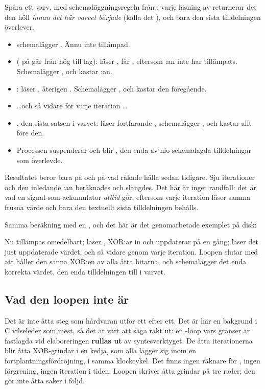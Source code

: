 Spåra ett varv, med schemaläggningsregeln från : varje läsning av
 returnerar det den höll \emph{innan det här varvet började} (kalla det
), och bara den sista tilldelningen överlever.
\begin{itemize}
  \item {} schemalägger . Ännu inte tillämpad.
  \item {} ( på  går från hög till låg): läser
    , får , eftersom :an inte har tillämpats.
    Schemalägger , och kastar :an.
  \item {}: läser , återigen . Schemalägger
    , och kastar den föregående.
  \item \dots och så vidare för varje iteration \dots
  \item {}, den sista satsen i varvet: läser fortfarande , schemalägger
    , och kastar allt före den.
  \item Processen suspenderar och  blir , den enda av
    nio schemalagda tilldelningar som överlevde.
\end{itemize}

Resultatet beror bara på  och på vad  råkade hålla sedan tidigare. Sju
iterationer och den inledande :an beräknades och slängdes. Det här är inget randfall: det
är vad en signal-som-ackumulator \emph{alltid} gör, eftersom varje iteration läser samma frusna
värde och bara den textuellt sista tilldelningen behålls.

Samma beräkning med en , och det här är det genomarbetade exemplet på disk:


Nu tillämpas  omedelbart;  läser , XOR:ar in 
och uppdaterar  på en gång;  läser det just uppdaterade värdet, och så vidare
genom varje iteration. Loopen slutar med att  håller den sanna XOR:en av alla åtta
bitarna, och  schemalägger det enda korrekta värdet, den enda tilldelningen
till  i varvet.

\subsection*{Vad den loopen inte är}
Det är inte åtta steg som hårdvaran utför ett efter ett. Det är här en bakgrund i C vilseleder som
mest, så det är värt att säga rakt ut: en -loop vars gränser är fastlagda vid
elaboreringen \textbf{rullas ut} av syntesverktyget. De åtta iterationerna blir åtta XOR-grindar i
en kedja, som alla lägger sig inom en fortplantningsfördröjning, i samma klockcykel. Det finns
ingen räknare för , ingen förgrening, ingen iteration i tiden. Loopen skriver åtta grindar
på tre rader; den gör inte åtta saker i följd.


